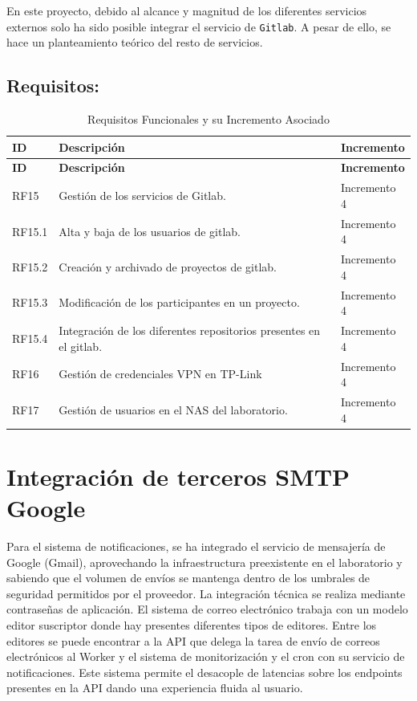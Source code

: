 En este proyecto, debido al alcance y magnitud de los diferentes servicios externos solo ha sido posible integrar el servicio de \texttt{Gitlab}. A pesar de ello, se hace un planteamiento teórico del resto de servicios.

\subsection{Requisitos:}

\begin{center}
\begin{longtable}{lp{8cm}l}  %
\caption{Requisitos Funcionales y su Incremento Asociado}
\label{tab:servcios_externos} \\
\toprule
\textbf{ID} & \textbf{Descripción} & \textbf{Incremento} \\
\midrule
\endfirsthead

\toprule
\textbf{ID} & \textbf{Descripción} & \textbf{Incremento} \\
\midrule
\endhead

\bottomrule
\endfoot

RF15 & Gestión de los servicios de Gitlab. & Incremento 4 \\
RF15.1   & Alta y baja de los usuarios de gitlab. & Incremento 4 \\
RF15.2 & Creación y archivado de proyectos de gitlab. & Incremento 4 \\
RF15.3 & Modificación de los participantes en un proyecto. & Incremento 4 \\
RF15.4 & Integración de los diferentes repositorios presentes en el gitlab. & Incremento 4 \\
RF16 & Gestión de credenciales VPN en TP-Link & Incremento 4 \\
RF17 & Gestión de usuarios en el NAS del laboratorio. & Incremento 4 \\
\end{longtable}
\end{center}
\normalsize

\section{Integración de terceros SMTP Google}

Para el sistema de notificaciones, se ha integrado el servicio de mensajería de Google (Gmail), aprovechando la infraestructura preexistente en el laboratorio y sabiendo que el volumen de envíos se mantenga dentro de los umbrales de seguridad permitidos por el proveedor. La integración técnica se realiza mediante contraseñas de aplicación. El sistema de correo electrónico trabaja con un modelo editor suscriptor donde hay presentes diferentes tipos de editores. Entre los editores se puede encontrar a la API que delega la tarea de envío de correos electrónicos al Worker y el sistema de monitorización y el cron con su servicio de notificaciones. Este sistema permite el desacople de latencias sobre los endpoints presentes en la API dando una experiencia fluida al usuario. \cite{npm_nodemailer_usage, npm_nodemailer} 
 
